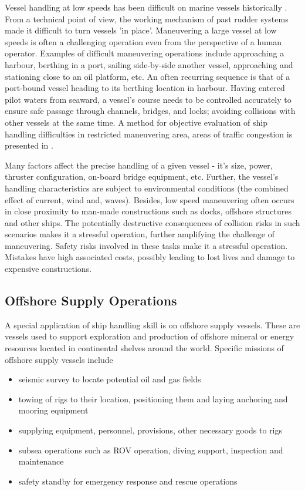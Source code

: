 Vessel handling at low speeds has been difficult on marine vessels historically \parencite{brittanica:ship}. From a technical point of view, the working mechanism of past rudder systems made it difficult to turn vessels 'in place'. Maneuvering a large vessel at low speeds is often a challenging operation even from the perspective of a human operator. Examples of difficult maneuvering operations include approaching a harbour, berthing in a port, sailing side-by-side another vessel, approaching and stationing close to an oil platform, etc. An often recurring sequence is that of a port-bound vessel heading to its berthing location in harbour. Having entered pilot waters from seaward, a vessel's course needs to be controlled accurately to ensure safe passage through channels, bridges, and locks; avoiding collisions with other vessels at the same time. A method for objective evaluation of ship handling difficulties in restricted maneuvering area, areas of traffic congestion is presented in \parencite{inoue2000evaluation}.

Many factors affect the precise handling of a given vessel - it's size, power, thruster configuration, on-board bridge equipment, etc. Further, the vessel's handling characteristics are subject to environmental conditions (the combined effect of current, wind and, waves). Besides, low speed maneuvering often occurs in close proximity to man-made constructions such as docks, offshore structures and other ships. The potentially destructive consequences of collision risks in such scenarios makes it a stressful operation, further amplifying the challenge of maneuvering. Safety risks involved in these tasks make it a stressful operation. Mistakes have high associated costs, possibly leading to lost lives and damage to expensive constructions.

\subsection{Offshore Supply Operations}

A special application of ship handling skill is on offshore supply vessels. These are vessels used to support exploration and production of offshore mineral or energy resources located in continental shelves around the world. Specific missions of offshore supply vessels include 

\begin{itemize}\renewcommand{\labelitemi}{\tiny$\blacksquare$} 
\item seismic survey to locate potential oil and gas fields
\item towing of rigs to their location, positioning them and laying anchoring and mooring equipment
\item supplying equipment, personnel, provisions, other necessary goods to rigs
\item subsea operations such as ROV operation, diving support, inspection and maintenance
\item safety standby for emergency response and rescue operations
\end{itemize}

